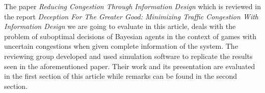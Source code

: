 The paper \textit{Reducing Congestion Through Information Design} which is reviewed in the report \textit{Deception For The Greater Good: Minimizing Traffic Congestion With
Information Design} we are going to evaluate in this article, deals with the problem of suboptimal decisions of Bayesian agents in the context of games with uncertain congestions when given complete information of the system. The reviewing group developed and used simulation software to replicate the results seen in the aforementioned paper. Their work and its presentation are evaluated in the first section of this article while remarks can be found in the second section.

